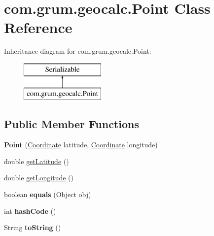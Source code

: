 \hypertarget{classcom_1_1grum_1_1geocalc_1_1_point}{}\section{com.\+grum.\+geocalc.\+Point Class Reference}
\label{classcom_1_1grum_1_1geocalc_1_1_point}
Inheritance diagram for com.\+grum.\+geocalc.\+Point\+:\begin{figure}[H]
\begin{center}
\leavevmode
\includegraphics[height=2.000000cm]{classcom_1_1grum_1_1geocalc_1_1_point}
\end{center}
\end{figure}
\subsection*{Public Member Functions}
\begin{DoxyCompactItemize}
\item 
\mbox{\label{classcom_1_1grum_1_1geocalc_1_1_point_a278aa6571ad548919de200ecc4c84338}} 
{\bfseries Point} (\mbox{\hyperlink{classcom_1_1grum_1_1geocalc_1_1_coordinate}{Coordinate}} latitude, \mbox{\hyperlink{classcom_1_1grum_1_1geocalc_1_1_coordinate}{Coordinate}} longitude)
\item 
double \mbox{\hyperlink{classcom_1_1grum_1_1geocalc_1_1_point_a0c1dbd62c61a1444ea459122d6a300c7}{get\+Latitude}} ()
\item 
double \mbox{\hyperlink{classcom_1_1grum_1_1geocalc_1_1_point_a668b70d0e0d450920eba977d61fbfbf0}{get\+Longitude}} ()
\item 
\mbox{\label{classcom_1_1grum_1_1geocalc_1_1_point_aeb48751b5bdd1b23c8dedcf2f7182af4}} 
boolean {\bfseries equals} (Object obj)
\item 
\mbox{\label{classcom_1_1grum_1_1geocalc_1_1_point_a639fe4862868c6a9afae665d1c014a6c}} 
int {\bfseries hash\+Code} ()
\item 
\mbox{\label{classcom_1_1grum_1_1geocalc_1_1_point_a69bc34ce3139839831cd081a43d136ac}} 
String {\bfseries to\+String} ()
\end{DoxyCompactItemize}


